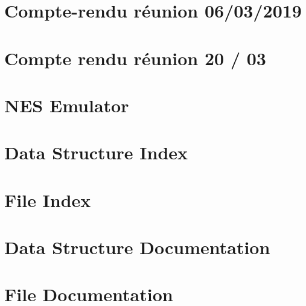 \documentclass[twoside]{book}
\newcommand{\+}{\discretionary{\mbox{\scriptsize$\hookleftarrow$}}{}{}}
\newcommand{\clearemptydoublepage}{%
  \newpage{\pagestyle{empty}\cleardoublepage}%
}
\begin{document}
\chapter{Compte-\/rendu réunion 06/03/2019}
\label{md_gestion-de-projet_reunions_cr-reunion-03-06-19}

\chapter{Compte rendu réunion 20 / 03}
\label{md_gestion-de-projet_reunions_cr-reunion-03-20-19}

\chapter{N\+ES Emulator}
\label{md__r_e_a_d_m_e}

\chapter{Data Structure Index}

\chapter{File Index}

\chapter{Data Structure Documentation}

















\chapter{File Documentation}















\backmatter
\newpage
{}
\clearemptydoublepage
{}
\printindex
\end{document}
